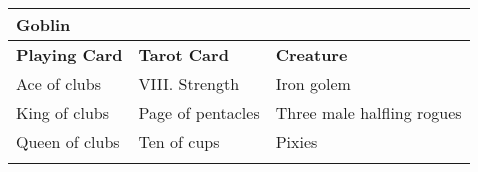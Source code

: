 \begin{longtable}{llllll}
{\begin{minipage}[t]{2.191in}
Goblin\end{minipage}}\\
\hline
\multicolumn{1}{|p{1.102in}|}{\begin{minipage}[t]{1.102in}\raggedright
\textbf{Playing Card}\end{minipage}} & \multicolumn{1}{p{1.207in}|}{\begin{minipage}[t]{1.207in}\raggedright
\textbf{Tarot Card}\end{minipage}} & \multicolumn{4}{p{2.191in}|}{\begin{minipage}[t]{2.191in}\raggedright
\textbf{Creature}\end{minipage}}\\
\hline
\multicolumn{1}{|p{1.102in}|}{\begin{minipage}[t]{1.102in}\raggedright
Ace of clubs\end{minipage}} & \multicolumn{1}{p{1.207in}|}{\begin{minipage}[t]{1.207in}\raggedright
VIII. Strength\end{minipage}} & \multicolumn{4}{p{2.191in}|}{\begin{minipage}[t]{2.191in}\raggedright
Iron golem\end{minipage}}\\
\hline
\multicolumn{1}{|p{1.102in}|}{\begin{minipage}[t]{1.102in}\raggedright
King of clubs\end{minipage}} & \multicolumn{1}{p{1.207in}|}{\begin{minipage}[t]{1.207in}\raggedright
Page of pentacles\end{minipage}} & \multicolumn{4}{p{2.191in}|}{\begin{minipage}[t]{2.191in}\raggedright
Three male halfling rogues\end{minipage}}\\
\hline
\multicolumn{1}{|p{1.102in}|}{\begin{minipage}[t]{1.102in}\raggedright
Queen of clubs\end{minipage}} & \multicolumn{1}{p{1.207in}|}{\begin{minipage}[t]{1.207in}\raggedright
Ten of cups\end{minipage}} & \multicolumn{4}{p{2.191in}|}{\begin{minipage}[t]{2.191in}\raggedright
Pixies\end{minipage}}\\
\hline
\multicolumn{1}{|p{1.102in}|}{\begin{minipage}[t]{1.102in}\raggedright

\end{minipage}}
\end{longtable}
